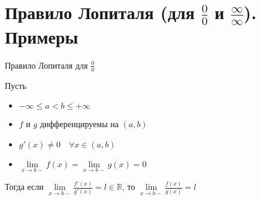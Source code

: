 \section{Правило Лопиталя (для $\frac{0}{0}$ и $\frac{\infty}{\infty}$). Примеры}

\begin{theorem-non} 
    Правило Лопиталя для $\frac{0}{0}$

    Пусть 
    \begin{itemize}
        \item $-\infty \leq a < b \leq +\infty$
        \item $f$ и $g$ дифференцируемы на $(a, b)$
        \item $g'(x) \neq 0 \quad \forall x \in (a, b)$
        \item $\lim\limits_{x \rightarrow b-} f(x) = \lim\limits_{x \rightarrow b-} g(x) = 0$
    \end{itemize}
    Тогда если $\lim\limits_{x \rightarrow b-}\frac{f'(x)}{g'(x)} = l \in \mathbb{R}$, 
    то $\lim\limits_{x \rightarrow b-}\frac{f(x)}{g(x)} = l$
\end{theorem-non}
